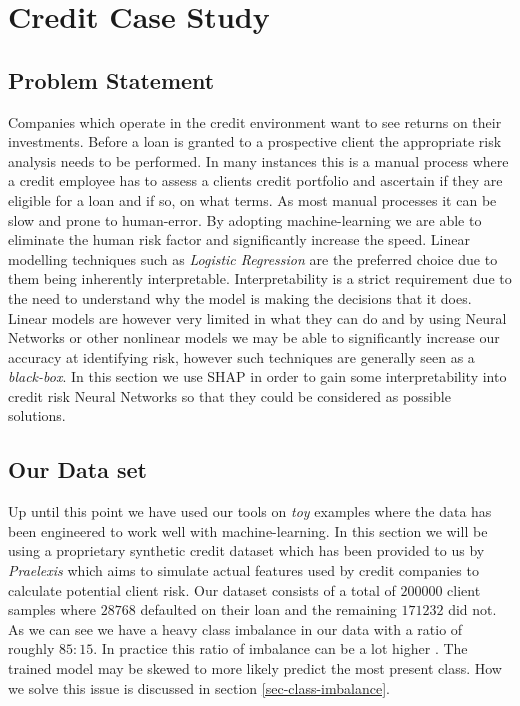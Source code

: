 
\chapter{Credit Case Study}

\section{Problem Statement}
Companies which operate in the credit environment want to see returns on their investments. Before a loan is granted to a prospective client the appropriate risk analysis needs to be performed. In many instances this is a manual process where a credit employee has to assess a clients credit portfolio and ascertain if they are eligible for a loan and if so, on what terms. As most manual processes it can be slow and prone to human-error. By adopting machine-learning we are able to eliminate the human risk factor and significantly increase the speed. Linear modelling techniques such as \emph{Logistic Regression} are the preferred choice due to them being inherently interpretable. Interpretability is a strict requirement due to the need to understand why the model is making the decisions that it does. Linear models are however very limited in what they can do and by using Neural Networks or other nonlinear models we may be able to significantly increase our accuracy at identifying risk, however such techniques are generally seen as a \emph{black-box}. In this section we use SHAP in order to gain some interpretability into credit risk Neural Networks so that they could be considered as possible solutions.

\section{Our Data set} Up until this point we have used our tools on \emph{toy} examples where the data has been engineered to work well with machine-learning. In this section we will be using a proprietary synthetic credit dataset which has been provided to us by \emph{Praelexis} which aims to simulate actual features used by credit companies to calculate potential client risk. Our dataset consists of a total of $200000$ client samples where $28768$ defaulted on their loan and the remaining $171232$ did not. As we can see we have a heavy class imbalance in our data with a ratio of roughly $85:15$. In practice this ratio of imbalance can be a lot higher \cite{doi:10.1142/9789812813312_0009}. The trained model may be skewed to more likely predict the most present class. How we solve this issue is discussed in section \ref{sec-class-imbalance}.

